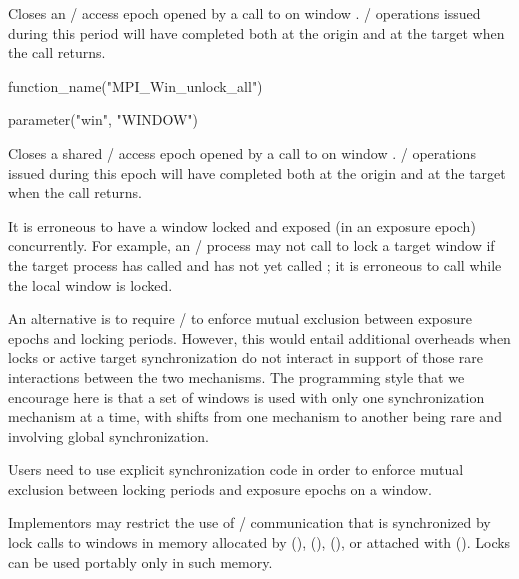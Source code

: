 Closes an \RMA/ access epoch opened by a call to
 on window .
\RMA/ operations issued during this
period will have completed both at the origin and at the target when the call returns.

%
\begin{mpi-binding}
    function_name("MPI_Win_unlock_all")
    
    parameter("win", "WINDOW")
\end{mpi-binding}

Closes a shared \RMA/ access epoch opened by a call to
 on window .
\RMA/ operations issued during this
epoch will have completed both at the origin and at the target when the call returns.

\bigskip%

It is erroneous to have a window locked and exposed (in an exposure
epoch) concurrently.  For example, an \mpi/ process may not call
 to lock a target window if the target process
has called  and has not yet called
; it is erroneous to call
 while the local window is locked.

\begin{rationale}
An alternative is to require \MPI/ to enforce mutual exclusion between exposure epochs and locking periods.  However, this would entail additional
overheads when locks or active target synchronization do not interact
in support of those rare interactions between the two mechanisms.  The
programming style that we encourage here is that a set of windows is
used with only one synchronization mechanism at a time, with shifts
from one mechanism to another being rare and involving global synchronization.
\end{rationale}

\begin{users}
Users need to use explicit synchronization code in order to enforce
mutual exclusion between locking periods and exposure epochs on a
window.
\end{users}

%
%
Implementors may restrict the use of \RMA/ communication that is 
synchronized by lock calls to windows in memory allocated by 
(),
 (),
 (), or attached with
 \gb().
Locks can be used portably only in such memory.

